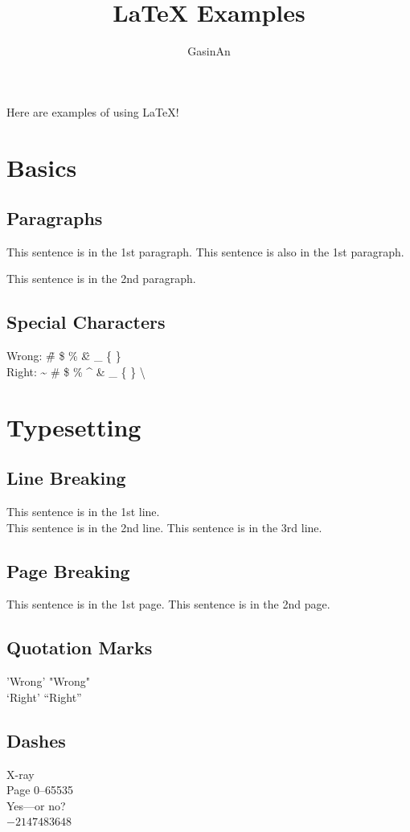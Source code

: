 \documentclass{article}
\title{\LaTeX{} Examples}
\author{GasinAn}
\begin{document}
    \maketitle
    Here are examples of using \LaTeX{}!
    \section{Basics}
    \subsection{Paragraphs}
    This sentence is in the 1st paragraph.
    This sentence is also in the 1st paragraph.

    This sentence is in the 2nd paragraph.
    \subsection{Special Characters}
    Wrong: \~ \# \$ \% \^ \& \_ \{ \} \\
    Right: \~{} \#{} \${} \%{} \^{} \&{} \_{} \{{} \}{} \textbackslash{}
    \section{Typesetting}
    \subsection{Line Breaking}
    This sentence is in the 1st line.\\
    This sentence is in the 2nd line.\newline
    This sentence is in the 3rd line.
    \subsection{Page Breaking}
    This sentence is in the 1st page.\newpage
    This sentence is in the 2nd page.
    \subsection{Quotation Marks}
    'Wrong' "Wrong"\\
    `Right' ``Right''
    \subsection{Dashes}
    X-ray\\
    Page 0--65535\\
    Yes---or no?\\
    $-2147483648$
\end{document}
